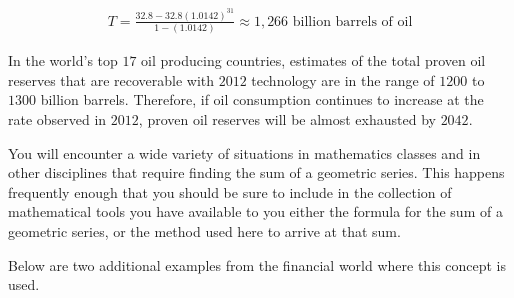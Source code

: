 \documentclass[10pt,]{book}
\theoremstyle{plain}
\theoremstyle{definition}
\theoremstyle{definition}
\theoremstyle{definition}
\numberwithin{equation}{section}
\begin{document}
\begin{gather*}
T = \frac{32.8-32.8(1.0142)^{31}}{1-(1.0142)} \approx 1,266 \text{ billion barrels of oil} 
\end{gather*}
%
\par
In the world’s top \(17\) oil producing countries, estimates of the total proven oil reserves that are recoverable with \(2012\) technology are in the range of \(1200\) to \(1300\) billion barrels.  Therefore, if oil consumption continues to increase at the rate observed in \(2012\), proven oil reserves will be almost exhausted by \(2042\).%
\par
You will encounter a wide variety of situations in mathematics classes and in other disciplines that require finding the sum of a geometric series. This happens frequently enough that you should be sure to include in the collection of mathematical tools you have available to you either the formula for the sum of a geometric series, or the method used here to arrive at that sum.%
\par
Below are two additional examples from the financial world where this concept is used.%
\end{document}
